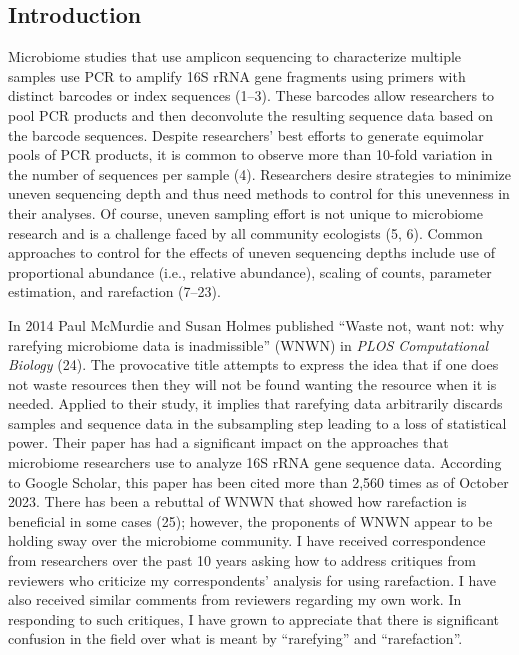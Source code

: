 \documentclass[
]{article}
\begin{document}
\newpage

\hypertarget{introduction}{%
\subsection{Introduction}\label{introduction}}

Microbiome studies that use amplicon sequencing to characterize multiple
samples use PCR to amplify 16S rRNA gene fragments using primers with
distinct barcodes or index sequences (1--3). These barcodes allow
researchers to pool PCR products and then deconvolute the resulting
sequence data based on the barcode sequences. Despite researchers' best
efforts to generate equimolar pools of PCR products, it is common to
observe more than 10-fold variation in the number of sequences per
sample (4). Researchers desire strategies to minimize uneven sequencing
depth and thus need methods to control for this unevenness in their
analyses. Of course, uneven sampling effort is not unique to microbiome
research and is a challenge faced by all community ecologists (5, 6).
Common approaches to control for the effects of uneven sequencing depths
include use of proportional abundance (i.e., relative abundance),
scaling of counts, parameter estimation, and rarefaction (7--23).

In 2014 Paul McMurdie and Susan Holmes published ``Waste not, want not:
why rarefying microbiome data is inadmissible'' (WNWN) in \emph{PLOS
Computational Biology} (24). The provocative title attempts to express
the idea that if one does not waste resources then they will not be
found wanting the resource when it is needed. Applied to their study, it
implies that rarefying data arbitrarily discards samples and sequence
data in the subsampling step leading to a loss of statistical power.
Their paper has had a significant impact on the approaches that
microbiome researchers use to analyze 16S rRNA gene sequence data.
According to Google Scholar, this paper has been cited more than 2,560
times as of October 2023. There has been a rebuttal of WNWN that showed
how rarefaction is beneficial in some cases (25); however, the
proponents of WNWN appear to be holding sway over the microbiome
community. I have received correspondence from researchers over the past
10 years asking how to address critiques from reviewers who criticize my
correspondents' analysis for using rarefaction. I have also received
similar comments from reviewers regarding my own work. In responding to
such critiques, I have grown to appreciate that there is significant
confusion in the field over what is meant by ``rarefying'' and
``rarefaction''.
\end{document}
